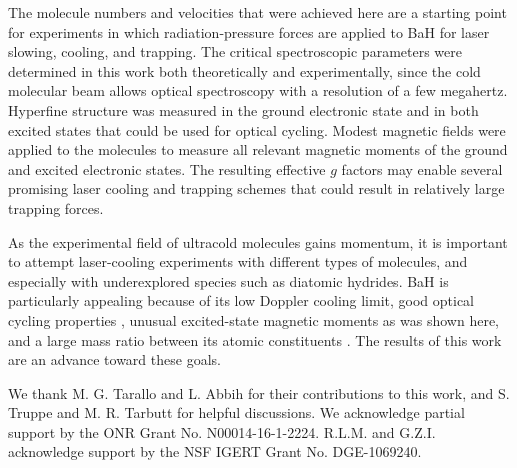 \documentclass[amsmath,amssymb,aps,twocolumn,longbibliography,notitlepage]{revtex4-1}
\begin{document}
The molecule numbers and velocities that were achieved here are a starting point for experiments in which radiation-pressure forces are applied to BaH for laser slowing, cooling, and trapping.  The critical spectroscopic parameters were determined in this work both theoretically and experimentally, since the cold molecular beam allows optical spectroscopy with a resolution of a few megahertz.  Hyperfine structure was measured in the ground electronic state and in both excited states that could be used for optical cycling.  Modest magnetic fields were applied to the molecules to measure all relevant magnetic moments of the ground and excited electronic states.  The resulting effective $g$ factors may enable several promising laser cooling and trapping schemes that could result in relatively large trapping forces.

As the experimental field of ultracold molecules gains momentum, it is important to attempt laser-cooling experiments with different types of molecules, and especially with underexplored species such as diatomic hydrides.  BaH is particularly appealing because of its low Doppler cooling limit, good optical cycling properties \cite{ZelevinskyTaralloPRA16_BaH,LanePRA15_HFromBaH}, unusual excited-state magnetic moments as was shown here, and a large mass ratio between its atomic constituents \cite{LanePRA15_HFromBaH}.  The results of this work are an advance toward these goals.

\begin{acknowledgments}
We thank M. G. Tarallo and L. Abbih for their contributions to this work, and S. Truppe and M. R. Tarbutt for helpful discussions.  We acknowledge partial support by the ONR Grant No. N00014-16-1-2224.  R.L.M. and G.Z.I. acknowledge support by the NSF IGERT Grant No. DGE-1069240.
\end{acknowledgments}
\end{document}
